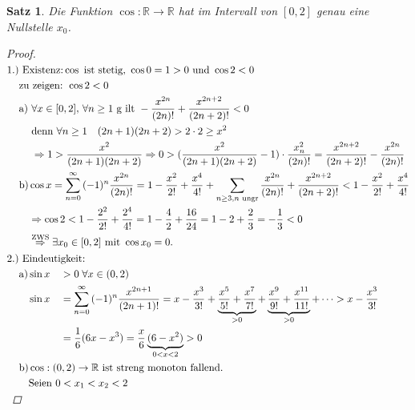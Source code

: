 \documentclass[a4paper,titlepage,oneside]{article}
\def\R{\ensuremath{\mathbb{R}} }
\def\zz{\text{zu zeigen: }}
\def\sp{\hspace{0,1cm}}
\newcommand{\suminf}[2][n]{\ensuremath{\sum_{#1= 0}^{\infty}{#2}}}
\theoremstyle{thmstyle}
\newtheorem{satz}{Satz}[section]
\theoremstyle{subthmstyle}
\begin{document}
\begin{satz}
Die Funktion $\cos : \R \to \R $ hat im Intervall von $[0,2]$ genau eine Nullstelle $x_0$.
\begin{proof}
\begin{math}\begin{aligned}[t]
\text{1.)}&\text{ Existenz:}\cos\text{ ist stetig, }\cos 0 = 1 > 0\text{ und }\cos 2 < 0 \\
&\zz \cos 2 < 0\\
&\begin{aligned}[t]\text{a) }&\forall x \in [0,2], \,\forall n \ge 1 \text{ g ilt } -\frac{x^{2n}}{(2n)! }+ \frac{x^{2n+2}}{(2n+2)!} < 0 \\
&\text{denn } \forall n \ge 1 \quad (2n + 1)(2n + 2) > 2 \cdot 2 \ge x ^2\\
&\Rightarrow 1 > \frac{x^2}{(2n + 1)(2n + 2)} \Rightarrow 0 > (\frac{x^2}{(2n + 1)(2n + 2)} - 1) \cdot \frac{x^2_n}{(2n)!}  = \frac{x^{2n+2}}{(2n+2)!} -\frac{x^{2n}}{(2n)! }
\end{aligned}\\
&\begin{aligned}[t]\text{b)}&\cos x = \suminf{(-1)^n \frac{x^{2n}}{(2n)!}} = 1 - \frac{x^2}{2!} + \frac{x^4}{4!} + \sum_{n \ge 3, n \text{ ungr}}{\frac{x^{2n}}{(2n)! }+ \frac{x^{2n+2}}{(2n+2)!}} < 1 - \frac{x^2}{2!} + \frac{x^4}{4!}\\
&\Rightarrow \cos 2 < 1 - \frac{2^2}{2!} + \frac{2^4}{4!} = 1 - \frac{4}{2} + \frac{16}{24} = 1 - 2 + \frac{2}{3} = -\frac{1}{3} < 0\\
&\overset{\text{ZWS}}{\Rightarrow} \exists x_0 \in [0,2] \text{ mit } \cos{x_0} = 0.\end{aligned}\\
\text{2.)}&\text{ Eindeutigkeit:}\\
&\begin{aligned}[t]\text{a)}&\sin x &&> 0 \sp \forall x \in (0,2)\\
&\sin x &&= \suminf{(-1)^n \frac{x^{2n+1}}{(2n+1)!}} = x - \frac{x^3}{3!} + \underbrace{\frac{x^5}{5!} + \frac{x^7}{7!}}_{>0}  + \underbrace{\frac{x^9}{9!} + \frac{x^{11}}{11!}}_{>0} + \dots > x - \frac{x^3}{3!}\\
& &&= \frac{1}{6}(6x - x^3) = \frac{x}{6}\underbrace{(6-x^2)}_{0 < x < 2} > 0
\end{aligned}\\
&\begin{aligned}[t]\text{b)}&\cos : (0,2) \to \R\text{ ist streng monoton fallend.}\\
&\text{Seien } 0 < x_1 < x_2 < 2 \\

\end{aligned}
\end{aligned}
\end{math}
\end{proof}
\end{satz}
\end{document}
